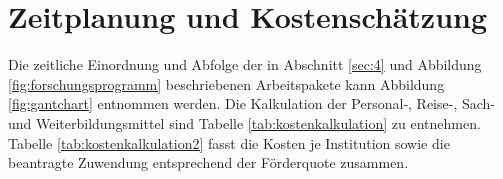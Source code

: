 \documentclass[a4paper,11pt,twoside]{scrartcl}
\begin{document}
\section{Zeitplanung und Kostenschätzung}
Die zeitliche Einordnung und Abfolge der in Abschnitt \ref{sec:4} und Abbildung \ref{fig:forschungsprogramm} beschriebenen Arbeitspakete kann Abbildung \ref{fig:gantchart} entnommen werden. Die Kalkulation der Personal-, Reise-, Sach- und Weiterbildungsmittel sind Tabelle \ref{tab:kostenkalkulation} zu entnehmen. Tabelle \ref{tab:kostenkalkulation2} fasst die Kosten je Institution sowie die beantragte Zuwendung entsprechend der Förderquote zusammen.
\end{document}
